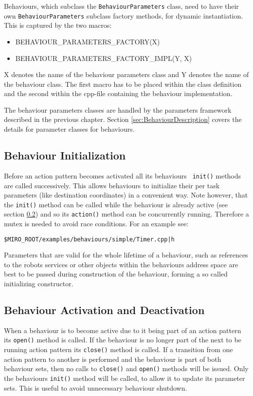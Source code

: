 Behaviours, which subclass the {\tt BehaviourParameters} class,
need to have their own {\tt BehaviourParameters}
subclass factory methods, for dynamic instantiation. This is captured by
the two macros:
\begin{itemize}
\item BEHAVIOUR\_PARAMETERS\_FACTORY(X)
\item BEHAVIOUR\_PARAMETERS\_FACTORY\_IMPL(Y, X)
\end{itemize}
X denotes the name of the behaviour parameters class and Y denotes the
name of the behaviour class. The first macro has to be placed within
the class definition and the second within the cpp-file containing the
behaviour implementation.

The behaviour parameters classes are handled by the parameters
framework described in the previous chapter. Section
\ref{sec:BehaviourDescription} covers the details for parameter
classes for behaviours.

\subsection{Behaviour Initialization}
\label{sec:init}

Before an action pattern becomes activated all its behaviours {\tt
  init()} methods are called successively. This allows behaviours to
initialize their per task parameters (like destination coordinates) in
a convenient way. Note however, that the {\tt init()} method can be
called while the behaviour is already active (see section
\ref{sec:active-inactive}) and so its {\tt action()} method can be
concurrently running. Therefore a mutex is needed to avoid race
conditions. For an example see:

{\tt \$MIRO\_ROOT/examples/behaviours/simple/Timer.cpp|h}

Parameters that are valid for the whole lifetime of a behaviour, such
as references to the robots services or other objects within the
behaviours address space are best to be passed during construction
of the behaviour, forming a so called initializing constructor.

\subsection{Behaviour Activation and Deactivation}
\label{sec:active-inactive}

When a behaviour is to become active due to it being part of an action
pattern its {\tt open()} method is called. If the behaviour is no longer
part of the next to be running action pattern its {\tt close()} method is
called. If a transition from one action pattern to another is
performed and the behaviour is part of both behaviour sets, then no
calls to {\tt close()} and {\tt open()} methods will be issued. Only the
behaviours {\tt init()} method will be called, to allow it to update its
parameter sets. This is useful to avoid unnecessary behaviour
shutdown.

